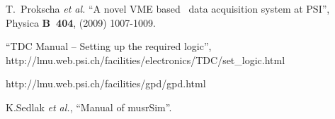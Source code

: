 \documentclass[twoside]{dis04}
\begin{document}
\begin{thebibliography}{0}

  T.~Prokscha {\it et al.} ``A novel VME based \musr\ data acquisition system at PSI'',
Physica {\bf B~404}, (2009) 1007-1009.

 ``TDC Manual -- Setting up the required logic'', 
http://lmu.web.psi.ch/facilities/electronics/TDC/set\_logic.html

http://lmu.web.psi.ch/facilities/gpd/gpd.html

K.Sedlak {\it et al.}, ``Manual of musrSim''.


\end{thebibliography}
\end{document}
